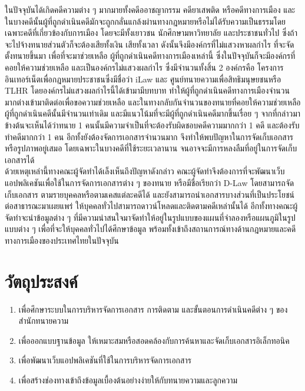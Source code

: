 \documentclass[12pt,oneside,openright,a4paper]{cpe-thai-project}
\begin{document}
\hspace*{1cm} ในปัจจุบันได้เกิดคดีความต่าง ๆ มากมายทั้งคดีออาชญากรรม คดียาเสพติด หรือคดีทางการเมือง และในบางคดีนั้นผู้ที่ถูกดำเนินคดีมักจะถูกกลั่นแกล้งผ่านทางกฎหมายหรือไม่ได้รับความเป็นธรรมโดยเฉพาะคดีที่เกี่ยวข้องกับการเมือง โดยจะมีทั้งเยาวชน นักศึกษามหาวิทยาลัย และประชาชนทั่วไป ซึ่งถ้าจะไปจ้างทนายส่วนตัวก็จะต้องเสียทั้งเงิน เสียทั้งเวลา ดังนั้นจึงมีองค์กรที่ไม่แสวงหาผลกำไร ที่จะจัดตั้งทนายขึ้นมา เพื่อที่จะมาช่วยเหลือ ผู้ที่ถูกดำเนินคดีทางการเมืองเหล่านี้ ซึ่งในปัจจุบันก็จะมีองค์กรที่คอยให้ความช่วยเหลือ และเป็นองค์กรไม่แสวงผลกำไร ซึ่งมีจำนวนทั้งสิ้น 2 องค์กรคือ โครงการอินเทอร์เน็ตเพื่อกฎหมายประชาชนซึ่งมีชื่อว่า iLaw และ ศูนย์ทนายความเพื่อสิทธิมนุษยชนหรือ TLHR โดยองค์กรไม่แสวงผลกำไรนี้ได้เข้ามามีบทบาท ทำให้ผู้ที่ถูกดำเนินคดีทางการเมืองจำนวนมากต่างเข้ามาติดต่อเพื่อขอความช่วยเหลือ และในทางกลับกันจำนวนของทนายที่คอยให้ความช่วยเหลือผู้ที่ถูกดำเนินคดีนั้นมีจำนวนเท่าเดิม และมีแนวโน้มที่จะมีผู้ที่ถูกดำเนินคดีมากขึ้นเรื่อย ๆ  จากที่กล่าวมาข้างต้นจะเห็นได้ว่าทนาย 1 คนนั้นมีความจำเป็นที่จะต้องรับผิดชอบคดีความมากกว่า 1 คดี และต้องรับทำคดีมากกว่า 1 คน อีกทั้งยังต้องจัดการเอกสารจำนวนมาก จึงทำให้พบปัญหาในการจัดเก็บเอกสาร หรือรูปภาพอยู่เสมอ โดยเฉพาะในบางคดีที่ใช้ระยะเวลานาน จนอาจจะมีการหลงลืมที่อยู่ในการจัดเก็บเอกสารได้ \\
\hspace*{1cm} ด้วยเหตุเหล่านี้ทางคณะผู้จัดทำได้เล็งเห็นถึงปัญหาดังกล่าว คณะผู้จัดทำจึงต้องการที่จะพัฒนาเว็บแอปพลิเคชันเพื่อใช้ในการจัดการเอกสารต่าง ๆ ของทนาย หรือมีชื่อเรียกว่า D-Law โดยสามารถจัดเก็บเอกสาร ตามรายบุคคลหรือตามเคสแต่ละคดีได้ และยังสามารถนำเอกสารบางส่วนที่เป็นประโยชน์ต่อสาธารณะมาเผยแพร่ ให้บุคคลทั่วไปสามารถดาวน์โหลดและติดตามคดีเหล่านั้นได้ อีกทั้งทางคณะผู้จัดทำจะนำข้อมูลต่าง ๆ ที่มีความน่าสนใจมาจัดทำให้อยู่ในรูปแบบของแผนที่จำลองหรือแผนภูมิในรูปแบบต่าง ๆ เพื่อที่จะให้บุคคลทั่วไปได้ศึกษาข้อมูล พร้อมทั้งเข้าถึงสถานการณ์ทางด้านกฎหมายและคดีทางการเมืองของประเทศไทยในปัจจุบัน

\section{วัตถุประสงค์}
\begin{enumerate}
  \item เพื่อศึกษาระบบในการบริหารจัดการเอกสาร การติดตาม และขั้นตอนการดำเนินคดีต่าง ๆ ของสำนักทนายความ
  \item เพื่อออกแบบฐานข้อมูล ให้เหมาะสมหรือสอดคล้องกับการค้นหาและจัดเก็บเอกสารอิเล็กทอนิค
  \item เพื่อพัฒนาเว็บแอปพลิเคชันที่ใช้ในการบริหารจัดการเอกสาร
  \item เพื่อสร้างช่องทางเข้าถึงข้อมูลเบื้องต้นอย่างง่ายให้กับทนายความและลูกความ
\end{enumerate}
\end{document}
